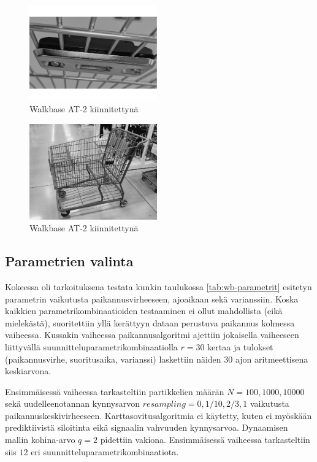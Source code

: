\documentclass[
  12pt,
  a4paper, twoside]{book}
\begin{document}
\begin{multicols}{2}
\begin{figure}[H]
\centering
\includegraphics[width=5.5cm]{at_2_cart}
\caption{Walkbase AT-2 kiinnitettynä}
\label{fig:at2_cart}
\end{figure}

\begin{figure}[H]
\centering
\includegraphics[width=5.5cm]{at_2_cart2}
\caption{Walkbase AT-2 kiinnitettynä}
\label{fig:at2_cart2}
\end{figure}
\end{multicols}

\subsection{Parametrien valinta} \label{parametrien-valinta}

Kokeessa oli tarkoituksena testata kunkin taulukossa \ref{tab:wb-parametrit} esitetyn parametrin vaikutusta paikannusvirheeseen, ajoaikaan sekä varianssiin. Koska kaikkien parametrikombinaatioiden testaaminen ei ollut mahdollista (eikä mielekästä), suoritettiin yllä kerättyyn dataan perustuva paikannus kolmessa vaiheessa. Kussakin vaiheessa paikannusalgoritmi ajettiin jokaisella vaiheeseen liittyvällä suunnitteluparametrikombinaatiolla \(r=30\) kertaa ja tulokset (paikannusvirhe, suoritusaika, varianssi) laskettiin näiden \(30\) ajon aritmeettisena keskiarvona.

Ensimmäisessä vaiheessa tarkasteltiin partikkelien määrän \(N={100,1000,10000}\) sekä uudelleenotannan kynnysarvon \(resampling={0,1/10,2/3,1}\) vaikutusta paikannuskeskivirheeseen. Karttasovitusalgoritmia ei käytetty, kuten ei myöskään prediktiivistä siloitinta eikä signaalin vahvuuden kynnysarvoa. Dynaamisen mallin kohina-arvo \(q=2\) pidettiin vakiona. Ensimmäisessä vaiheessa tarkasteltiin siis \(12\) eri suunnitteluparametrikombinaatiota.
\end{document}
